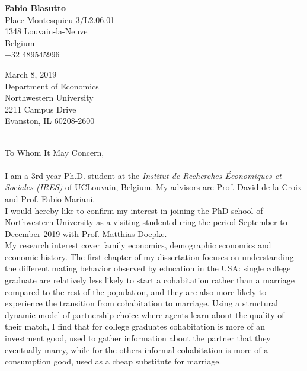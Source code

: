 \documentclass[12pt]{article}
\begin{document}
  {\parbox{\textwidth}{\raggedleft \textbf{Fabio Blasutto}\\ %
 Place Montesquieu 3/L2.06.01\\ %
 1348 Louvain-la-Neuve\\ %
 Belgium \\+32 489545996\\\vspace{0.2cm}}
  {\parbox{1.5\textwidth}{\raggedright March 8, 2019\\
  Department of Economics\\
Northwestern University\\
2211 Campus Drive\\
Evanston, IL 60208-2600}}
\vspace{0.5cm}\\
To Whom It May Concern,\\
\vspace{0.5cm}\\
I am a 3rd year Ph.D. student at the \textit{Institut de Recherches \'Economiques et Sociales (IRES)} of UCLouvain, Belgium. My advisors are Prof. David de la Croix and Prof. Fabio Mariani.\vspace{0.3cm}\\
I would hereby like to confirm my interest in joining the PhD school of Northwestern University as a visiting student during the period September to December 2019 with Prof. Matthias Doepke.\vspace{0.3cm}\\
My research interest cover family economics, demographic economics and economic history. The first chapter of my dissertation focuses on understanding the different mating behavior observed by education in the USA: single college graduate are relatively less likely to start a cohabitation rather than a marriage compared to the rest of the population, and they are also more likely to experience the transition from cohabitation to marriage. Using a structural dynamic model of partnership choice where agents learn about the quality of their match, I find that for college graduates cohabitation is more of an investment good, used to gather information about the partner that they eventually marry, while for the others informal cohabitation is more of a consumption good, used as a cheap substitute for marriage.\vspace{0.3cm}\\
}
\end{document}
